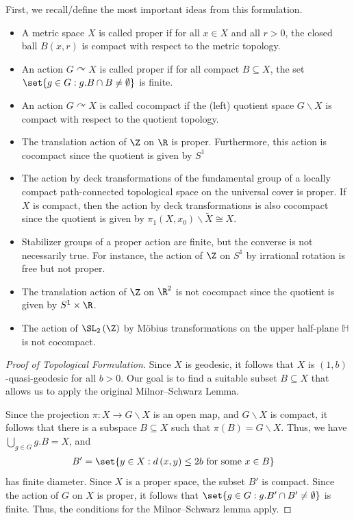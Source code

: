 \documentclass[10pt]{mypackage}
\begin{document}
First, we recall/define the most important ideas from this formulation.
\begin{itemize}
  \item A metric space $X$ is called proper if for all $x\in X$ and all $r > 0$, the closed ball $B\left( x,r \right)$ is compact with respect to the metric topology.
  \item An action $G\curvearrowright X$ is called proper if for all compact $B\subseteq X$, the set $\set{g\in G : g.B\cap B \neq \emptyset}$ is finite.
  \item An action $G\curvearrowright X$ is called cocompact if the (left) quotient space $G\backslash X$ is compact with respect to the quotient topology.
\end{itemize}
\begin{example}\hfill
  \begin{itemize}
    \item The translation action of $\Z$ on $\R$ is proper. Furthermore, this action is cocompact since the quotient is given by $S^1$
    \item The action by deck transformations of the fundamental group of a locally compact path-connected topological space on the universal cover is proper. If $X$ is compact, then the action by deck transformations is also cocompact since the quotient is given by $ \pi_1\left( X,x_0 \right)\backslash \widetilde{X}\cong X $.
    \item Stabilizer groups of a proper action are finite, but the converse is not necessarily true. For instance, the action of $\Z$ on $S^1$ by irrational rotation is free but not proper.
    \item The translation action of $\Z$ on $\R^2$ is not cocompact since the quotient is given by $S^1\times \R$.
    \item The action of $\SL_2\left( \Z \right)$ by Möbius transformations on the upper half-plane $ \mathbb{H} $ is not cocompact.
  \end{itemize}
\end{example}
\begin{proof}[Proof of Topological Formulation]
  Since $X$ is geodesic, it follows that $X$ is $\left( 1,b \right)$-quasi-geodesic for all $b > 0$. Our goal is to find a suitable subset $B\subseteq X$ that allows us to apply the original Milnor--Schwarz Lemma.

  Since the projection $\pi\colon X\rightarrow G\backslash X$ is an open map, and $G\backslash X$ is compact, it follows that there is a subspace $B\subseteq X$ such that $\pi(B) = G\backslash X$. Thus, we have $\bigcup_{g\in G}g.B = X$, and 
  \begin{align*}
    B' &= \set{y\in X : d\left( x,y \right) \leq 2b\text{ for some }x\in B}
  \end{align*}
  has finite diameter. Since $X$ is a proper space, the subset $B'$ is compact. Since the action of $G$ on $X$ is proper, it follows that $\set{g\in G : g.B'\cap B' \neq \emptyset}$ is finite. Thus, the conditions for the Milnor--Schwarz lemma apply.
\end{proof}
\end{document}
